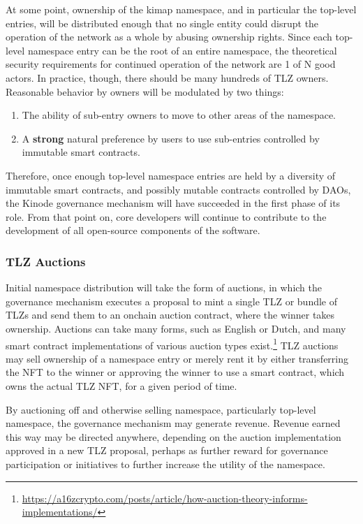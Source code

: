 \documentclass[runningheads]{llncs}
\begin{document}
At some point, ownership of the kimap namespace, and in particular the top-level entries, will be distributed enough that no single entity could disrupt the operation of the network as a whole by abusing ownership rights.
Since each top-level namespace entry can be the root of an entire namespace, the theoretical security requirements for continued operation of the network are 1 of N good actors.
In practice, though, there should be many hundreds of TLZ owners.
Reasonable behavior by owners will be modulated by two things:
\begin{enumerate}
    \item The ability of sub-entry owners to move to other areas of the namespace.
    \item A \textbf{strong} natural preference by users to use sub-entries controlled by immutable smart contracts.
\end{enumerate}

Therefore, once enough top-level namespace entries are held by a diversity of immutable smart contracts, and possibly mutable contracts controlled by DAOs, the Kinode governance mechanism will have succeeded in the first phase of its role.
From that point on, core developers will continue to contribute to the development of all open-source components of the software.

\subsubsection{TLZ Auctions}
\label{sec:tlzauctions}

Initial namespace distribution will take the form of auctions, in which the governance mechanism executes a proposal to mint a single TLZ or bundle of TLZs and send them to an onchain auction contract, where the winner takes ownership.
Auctions can take many forms, such as English or Dutch, and many smart contract implementations of various auction types exist.\footnote{\url{https://a16zcrypto.com/posts/article/how-auction-theory-informs-implementations/}}
TLZ auctions may sell ownership of a namespace entry or merely rent it by either transferring the NFT to the winner or approving the winner to use a smart contract, which owns the actual TLZ NFT, for a given period of time.

By auctioning off and otherwise selling namespace, particularly top-level namespace, the governance mechanism may generate revenue.
Revenue earned this way may be directed anywhere, depending on the auction implementation approved in a new TLZ proposal, perhaps as further reward for governance participation or initiatives to further increase the utility of the namespace.
\end{document}
